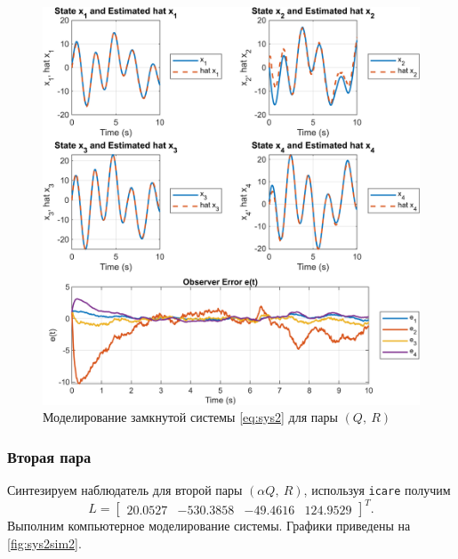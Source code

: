 \begin{figure}[H]
    \centering
    \includegraphics[width=0.9\linewidth]{figs/2_sim1.png}
    \caption{Моделирование замкнутой системы \eqref{eq:sys2} для пары $(Q,\ R)$}
    \label{fig:sys2sim1}
\end{figure}

\newpage\subsubsection{Вторая пара}

Синтезируем наблюдатель для второй пары $(\alpha Q,\ R)$, используя \texttt{icare} получим
\begin{equation*}
    L=\begin{bmatrix}
        20.0527&
        -530.3858&
         -49.4616&
         124.9529
    \end{bmatrix}^T.
\end{equation*}
Выполним компьютерное моделирование системы. Графики приведены на \autoref{fig:sys2sim2}.

